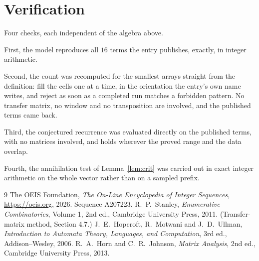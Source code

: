 \documentclass[11pt,a4paper]{article}
\theoremstyle{plain}
\theoremstyle{definition}
\begin{document}
\section{Verification}

Four checks, each independent of the algebra above.

First, the model reproduces all $16$ terms the entry publishes, exactly, in integer
arithmetic.

Second, the count was recomputed for the smallest arrays straight from the definition: fill the
cells one at a time, in the orientation the entry's own name writes, and reject as soon as a
completed run matches a forbidden pattern. No transfer matrix, no window and no transposition
are involved, and the published terms came back.

Third, the conjectured recurrence was evaluated directly on the published terms, with no
matrices involved, and holds wherever the proved range and the data overlap.

Fourth, the annihilation test of Lemma~\ref{lem:crit} was carried out in exact integer
arithmetic on the whole vector rather than on a sampled prefix.

\begin{thebibliography}{9}
 The OEIS Foundation, \emph{The On-Line Encyclopedia of Integer
Sequences}, \url{https://oeis.org}, 2026. Sequence A207223.
 R.~P.~Stanley, \emph{Enumerative Combinatorics}, Volume 1, 2nd ed.,
Cambridge University Press, 2011. (Transfer-matrix method, Section 4.7.)
 J.~E.~Hopcroft, R.~Motwani and J.~D.~Ullman, \emph{Introduction to Automata
Theory, Languages, and Computation}, 3rd ed., Addison--Wesley, 2006.
 R.~A.~Horn and C.~R.~Johnson, \emph{Matrix Analysis}, 2nd ed., Cambridge
University Press, 2013.
\end{thebibliography}
\end{document}
